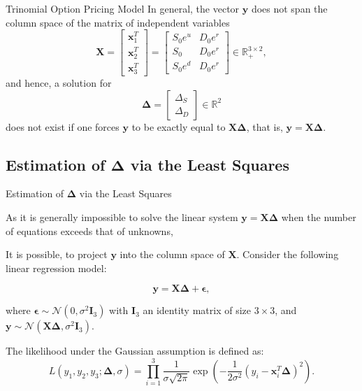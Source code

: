 \documentclass[aspectratio=169,xcolor=dvipsnames]{beamer}
\begin{document}
	\begin{frame}{Trinomial Option Pricing Model}
In general, the vector \( \mathbf{y} \) does not span the column space of the matrix of independent variables
\[
\mathbf{X} = 
\begin{bmatrix}
	\mathbf{x}_1^T \\
	\mathbf{x}_2^T \\
	\mathbf{x}_3^T
\end{bmatrix}
=
\begin{bmatrix}
	S_0 e^u & D_0 e^r \\
	S_0 & D_0 e^r \\
	S_0 e^d & D_0 e^r
\end{bmatrix}
\in \mathbb{R}_+^{3 \times 2},
\]
and hence, a solution for 
\[
\boldsymbol{\Delta} = 
\begin{bmatrix}
	\Delta_S \\
	\Delta_D
\end{bmatrix}
\in \mathbb{R}^2
\]
does not exist if one forces \( \mathbf{y} \) to be exactly equal to \( \mathbf{X} \boldsymbol{\Delta} \), that is, \( \mathbf{y} = \mathbf{X} \boldsymbol{\Delta} \).
	\end{frame}
	
	
	\subsection{Estimation of \( \boldsymbol{\Delta} \) via the Least Squares}
		\begin{frame}{Estimation of \( \boldsymbol{\Delta} \) via the Least Squares}
		 
			As it is generally impossible to solve the linear system \( \mathbf{y} = \mathbf{X} \boldsymbol{\Delta} \) when the number of equations exceeds that of unknowns,
		
		
		It is possible, to project \( \mathbf{y} \) into the column space of \( \mathbf{X} \). Consider the following linear regression model:
		
		\[
		\mathbf{y} = \mathbf{X} \boldsymbol{\Delta} + \boldsymbol{\epsilon},
		\]
		
		where \( \boldsymbol{\epsilon} \sim \mathcal{N}(0, \sigma^2 \mathbf{I}_3) \) with \( \mathbf{I}_3 \) an identity matrix of size \( 3 \times 3 \), and \( \mathbf{y} \sim \mathcal{N}(\mathbf{X} \boldsymbol{\Delta}, \sigma^2 \mathbf{I}_3) \).
		
		The likelihood under the Gaussian assumption is defined as:
		\[
		L(y_1, y_2, y_3; \boldsymbol{\Delta}, \sigma) = \prod_{i=1}^{3} \frac{1}{\sigma \sqrt{2\pi}} \exp\left( -\frac{1}{2\sigma^2} (y_i - \mathbf{x}_i^T \boldsymbol{\Delta})^2 \right).
		\]
	
	\end{frame}
	
\end{document}
